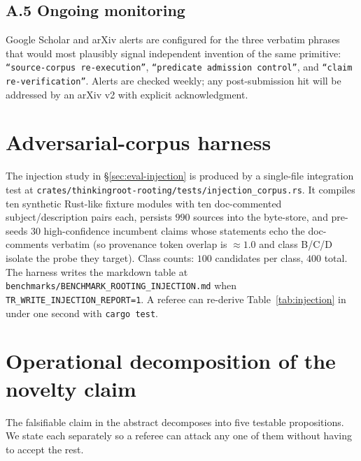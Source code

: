 \documentclass[10pt,a4paper]{article}
\begin{document}
\subsection*{A.5 Ongoing monitoring}
Google Scholar and arXiv alerts are configured for the three verbatim
phrases that would most plausibly signal independent invention of the
same primitive: \texttt{``source-corpus re-execution''},
\texttt{``predicate admission control''}, and
\texttt{``claim re-verification''}. Alerts are checked weekly; any
post-submission hit will be addressed by an arXiv v2 with explicit
acknowledgment.

\section{Adversarial-corpus harness}
\label{app:injection}

\begin{sloppypar}
The injection study in §\ref{sec:eval-injection} is produced by a
single-file integration test at
\texttt{crates/thinkingroot-rooting/tests/\-injection\_corpus.rs}.
It compiles ten synthetic Rust-like fixture modules with ten
doc-commented subject/description pairs each, persists $990$ sources
into the byte-store, and pre-seeds $30$ high-confidence incumbent
claims whose statements echo the doc-comments verbatim (so provenance
token overlap is $\approx 1.0$ and class B/C/D isolate the probe they
target). Class counts: $100$ candidates per class, $400$ total. The
harness writes the markdown table at
\texttt{benchmarks/BENCHMARK\_\-ROOTING\_\-INJECTION.md} when
\texttt{TR\_WRITE\_INJECTION\_REPORT=1}. A referee can re-derive
Table~\ref{tab:injection} in under one second with \texttt{cargo test}.
\end{sloppypar}

\section{Operational decomposition of the novelty claim}
\label{app:novelty}

The falsifiable claim in the abstract decomposes into five testable
propositions. We state each separately so a referee can attack any one
of them without having to accept the rest.
\end{document}
